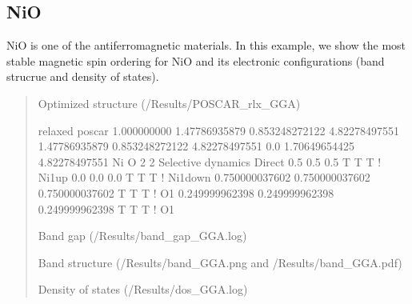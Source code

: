 \documentclass[letterpaper,10pt,english]{sphinxmanual}
\let\sphinxpxdimen\pdfpxdimen\else\newdimen\sphinxpxdimen
\begin{document}
\subsection{NiO}
\label{\detokenize{Examples/Examples:nio}}
NiO is one of the antiferromagnetic materials. In this example, we show the most stable magnetic spin ordering for NiO
and its electronic configurations (band strucrue and density of states).
\begin{quote}

Optimized structure (/Results/POSCAR\_rlx\_GGA)

\begin{sphinxVerbatim}[commandchars=\\\{\}]
relaxed poscar
1.000000000
    1.47786935879    0.853248272122    4.82278497551
    \PYGZhy{}1.47786935879    0.853248272122    4.82278497551
    0.0    \PYGZhy{}1.70649654425    4.82278497551
    Ni    O
    2    2
Selective dynamics
Direct
    0.5    0.5    0.5  T  T  T ! Ni1\PYGZus{}up
    \PYGZhy{}0.0    \PYGZhy{}0.0    0.0  T  T  T ! Ni1\PYGZus{}down
    0.750000037602    0.750000037602    0.750000037602  T  T  T ! O1
    0.249999962398    0.249999962398    0.249999962398  T  T  T ! O1
\end{sphinxVerbatim}

Band gap (/Results/band\_gap\_GGA.log)

\begin{sphinxVerbatim}[commandchars=\\\{\}]
         

               
               

    
    
\end{sphinxVerbatim}

Band structure (/Results/band\_GGA.png and /Results/band\_GGA.pdf)
\begin{quote}

\noindent\sphinxincludegraphics[width=300\sphinxpxdimen]{{band_GGA2}.png}
\end{quote}

Density of states (/Results/dos\_GGA.log)
\begin{quote}

\noindent\sphinxincludegraphics[width=150\sphinxpxdimen]{{dos_GGA1}.png}
\end{quote}
\end{quote}



\renewcommand{\indexname}{Index}
\printindex
\end{document}
